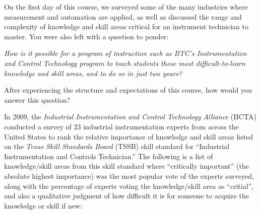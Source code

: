 

On the first day of this course, we surveyed some of the many industries where measurement and automation are applied, as well as discussed the range and complexity of knowledge and skill areas critical for an instrument technician to master.  You were also left with a question to ponder: 

\vskip 10pt {\narrower \noindent \baselineskip5pt

{\it How is it possible for a program of instruction such as BTC's Instrumentation and Control Technology program to teach students these most difficult-to-learn knowledge and skill areas, and to do so in just two years?} 

\par} \vskip 10pt

After experiencing the structure and expectations of this course, how would you answer this question?














In 2009, the {\it Industrial Instrumentation and Control Technology Alliance} (IICTA) conducted a survey of 23 industrial instrumentation experts from across the United States to rank the relative importance of knowledge and skill areas listed on the {\it Texas Skill Standards Board} (TSSB) skill standard for ``Industrial Instrumentation and Controls Technician.''  The following is a list of knowledge/skill areas from this skill standard where ``critically important'' (the absolute highest importance) was the most popular vote of the experts surveyed, along with the percentage of experts voting the knowledge/skill area as ``critial'', and also a qualitative judgment of how difficult it is for someone to acquire the knowledge or skill if new:



